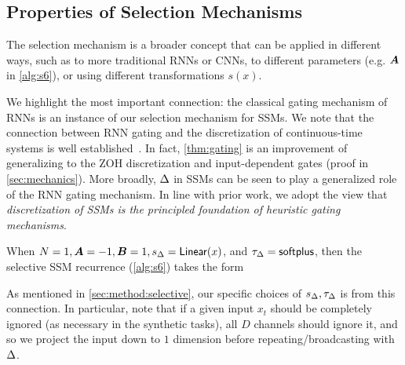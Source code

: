 \subsection{Properties of Selection Mechanisms}
\label{sec:method:properties}

The selection mechanism is a broader concept that can be applied in different ways,
such as to more traditional RNNs or CNNs, to different parameters (e.g. $\bm{A}$ in \cref{alg:s6}), or using different transformations $s(x)$.

\iftoggle{arxiv}{
  \subsubsection{Connection to Gating Mechanisms}
}{}
We highlight the most important connection: the classical gating mechanism of RNNs is an instance of our selection mechanism for SSMs.
We note that the connection between RNN gating and the discretization of continuous-time systems is well established~\citep{funahashi1993approximation,tallec2018can}.
In fact, \cref{thm:gating} is an improvement of \citet[Lemma 3.1]{gu2021combining} generalizing to the ZOH discretization and input-dependent gates (proof in \cref{sec:mechanics}).
More broadly, $\Delta$ in SSMs can be seen to play a generalized role of the RNN gating mechanism.
In line with prior work, we adopt the view that \emph{discretization of SSMs is the principled foundation of heuristic gating mechanisms}.
\begin{theorem}
  \label{thm:gating}
  When $N=1, \bm{A}=-1, \bm{B}=1, s_\Delta=\mathsf{Linear}(x)$, and $\tau_\Delta=\mathsf{softplus}$,
  then the selective SSM recurrence (\cref{alg:s6}) takes the form
  \iftoggle{arxiv}{
    \begin{equation}%
      \label{eq:gates}
      \begin{aligned}
        g_t &= \sigma(\mathsf{Linear}(x_t)) \\
        h_{t} &= (1-g_t) h_{t-1} + g_t x_t
        .
      \end{aligned}
    \end{equation}
  }{
    $g_t = \sigma(\mathsf{Linear}(x_t))$ (the \emph{gate}) and $h_{t} = (1-g_t) h_{t-1} + g_t x_t$.
  }
\end{theorem}

As mentioned in \cref{sec:method:selective}, our specific choices of $s_\Delta, \tau_\Delta$ is from this connection.
In particular, note that if a given input $x_t$ should be completely ignored (as necessary in the synthetic tasks),
all $D$ channels should ignore it, and so we project the input down to $1$ dimension before repeating/broadcasting with $\Delta$.



